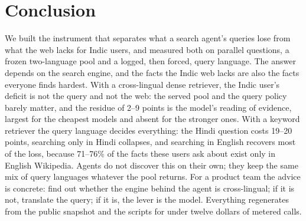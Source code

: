 \section{Conclusion}
\label{sec:conclusion}
We built the instrument that separates what a search agent's queries lose from what the web lacks for Indic users, and measured both on parallel questions, a frozen two-language pool and a logged, then forced, query language. The answer depends on the search engine, and the facts the Indic web lacks are also the facts everyone finds hardest. With a cross-lingual dense retriever, the Indic user's deficit is not the query and not the web: the served pool and the query policy barely matter, and the residue of 2--9 points is the model's reading of evidence, largest for the cheapest models and absent for the stronger ones. With a keyword retriever the query language decides everything: the Hindi question costs 19--20 points, searching only in Hindi collapses, and searching in English recovers most of the loss, because 71--76\% of the facts these users ask about exist only in English Wikipedia. Agents do not discover this on their own; they keep the same mix of query languages whatever the pool returns. For a product team the advice is concrete: find out whether the engine behind the agent is cross-lingual; if it is not, translate the query; if it is, the lever is the model. Everything regenerates from the public snapshot and the scripts for under twelve dollars of metered calls.

